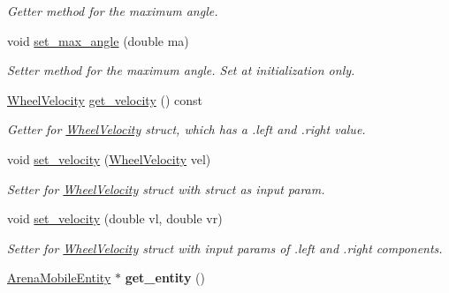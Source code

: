 \begin{DoxyCompactItemize}
\begin{DoxyCompactList}\small\item\em Getter method for the maximum angle. \end{DoxyCompactList}\item 
void \hyperlink{class_motion_handler_aa73973c705626f1f95ac59391f23bcc9}{set\+\_\+max\+\_\+angle} (double ma)\hypertarget{class_motion_handler_aa73973c705626f1f95ac59391f23bcc9}{}\label{class_motion_handler_aa73973c705626f1f95ac59391f23bcc9}

\begin{DoxyCompactList}\small\item\em Setter method for the maximum angle. Set at initialization only. \end{DoxyCompactList}\item 
\hyperlink{struct_wheel_velocity}{Wheel\+Velocity} \hyperlink{class_motion_handler_a99fe1b248e817556de2b366a2d98c57c}{get\+\_\+velocity} () const \hypertarget{class_motion_handler_a99fe1b248e817556de2b366a2d98c57c}{}\label{class_motion_handler_a99fe1b248e817556de2b366a2d98c57c}

\begin{DoxyCompactList}\small\item\em Getter for \hyperlink{struct_wheel_velocity}{Wheel\+Velocity} struct, which has a .left and .right value. \end{DoxyCompactList}\item 
void \hyperlink{class_motion_handler_ac4bf67ba783c1afb5a5839229de3f3f9}{set\+\_\+velocity} (\hyperlink{struct_wheel_velocity}{Wheel\+Velocity} vel)\hypertarget{class_motion_handler_ac4bf67ba783c1afb5a5839229de3f3f9}{}\label{class_motion_handler_ac4bf67ba783c1afb5a5839229de3f3f9}

\begin{DoxyCompactList}\small\item\em Setter for \hyperlink{struct_wheel_velocity}{Wheel\+Velocity} struct with struct as input param. \end{DoxyCompactList}\item 
void \hyperlink{class_motion_handler_af31975aa667ca20835e4d5bb0216706e}{set\+\_\+velocity} (double vl, double vr)\hypertarget{class_motion_handler_af31975aa667ca20835e4d5bb0216706e}{}\label{class_motion_handler_af31975aa667ca20835e4d5bb0216706e}

\begin{DoxyCompactList}\small\item\em Setter for \hyperlink{struct_wheel_velocity}{Wheel\+Velocity} struct with input params of .left and .right components. \end{DoxyCompactList}\item 
\hyperlink{class_arena_mobile_entity}{Arena\+Mobile\+Entity} $\ast$ {\bfseries get\+\_\+entity} ()\hypertarget{class_motion_handler_ad8472612d15be1ada7f919f45d245adc}{}\label{class_motion_handler_ad8472612d15be1ada7f919f45d245adc}


\end{DoxyCompactItemize}
